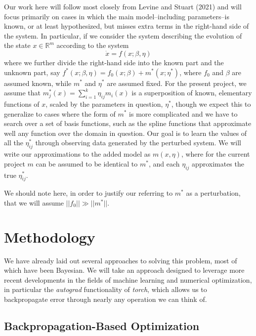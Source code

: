 \documentclass[12pt]{article}
\begin{document}
Our work here will follow most closely from Levine and Stuart (2021) and will focus primarily on cases in which the main model\---including parameters\---is known, or at least hypothesized, but misses extra terms in the right-hand side of the system. In particular, if we consider the system describing the evolution of the state $x \in \mathbb{R}^m$ according to the system $$\dot{x} = f(x;\beta, \eta)$$ where we further divide the right-hand side into the known part and the unknown part, say $f^*(x;\beta, \eta) = f_0(x; \beta) + m^*(x; \eta^*)$, where $f_0$ and $\beta$ are assumed known, while $m^*$ and $\eta^*$ are assumed fixed. For the present project, we assume that $m_j^*(x) = \sum_{i=1}^k \eta_{ij} m_i(x)$ is a superposition of known, elementary functions of $x$, scaled by the parameters in question, $\eta^*$, though we expect this to generalize to cases where the form of $m^*$ is more complicated and we have to search over a set of basis functions, such as the spline functions that approximate well any function over the domain in question. Our goal is to learn the values of all the $\eta^*_{ij}$ through observing data generated by the perturbed system. We will write our approximations to the added model as $m(x,\eta)$, where for the current project $m$ can be assumed to be identical to $m^*$, and each $\eta_{ij}$ approximates the true $\eta^*_{ij}$.

We should note here, in order to justify our referring to $m^*$ as a perturbation, that we will assume $||f_0|| \gg ||m^*||$.




\section{Methodology}

We have already laid out several approaches to solving this problem, most of which have been Bayesian. We will take an approach designed to leverage more recent developments in the fields of machine learning and numerical optimization, in particular the \textit{autograd} functionality of \textit{torch}, which allows us to backpropagate error through nearly any operation we can think of.



\subsection{Backpropagation-Based Optimization}
\end{document}
